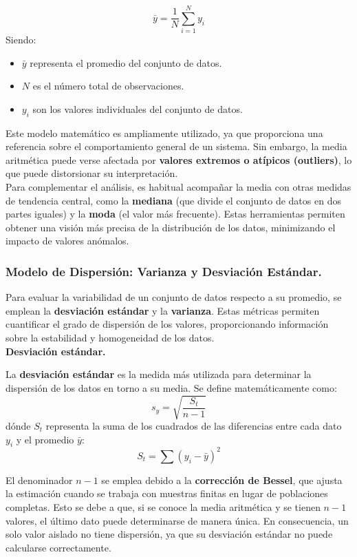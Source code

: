 \documentclass{article}
\begin{document}
\begin{equation}
    \bar{y} = \frac{1}{N} \sum_{i=1}^{N} y_i
\end{equation}
Siendo:
\begin{itemize}
    \item $\bar{y}$ representa el promedio del conjunto de datos.
    \item $N$ es el número total de observaciones.
    \item $y_i$ son los valores individuales del conjunto de datos.
\end{itemize}
Este modelo matemático es ampliamente utilizado, ya que proporciona una referencia sobre el comportamiento general de un sistema. Sin embargo, la media aritmética puede verse afectada por \textbf{valores extremos o atípicos (outliers)}, lo que puede distorsionar su interpretación.\\

Para complementar el análisis, es habitual acompañar la media con otras medidas de tendencia central, como la \textbf{mediana} (que divide el conjunto de datos en dos partes iguales) y la \textbf{moda} (el valor más frecuente). Estas herramientas permiten obtener una visión más precisa de la distribución de los datos, minimizando el impacto de valores anómalos.

\subsubsection{Modelo de Dispersión: Varianza y Desviación Estándar.}
Para evaluar la variabilidad de un conjunto de datos respecto a su promedio, se emplean la \textbf{desviación estándar} y la \textbf{varianza}. Estas métricas permiten cuantificar el grado de dispersión de los valores, proporcionando información sobre la estabilidad y homogeneidad de los datos.\\

\noindent \textbf{Desviación estándar.}

\noindent La \textbf{desviación estándar} es la medida más utilizada para determinar la dispersión de los datos en torno a su media. Se define matemáticamente como:
\begin{equation}
    s_y = \sqrt{\frac{S_t}{n-1}}
\end{equation}
dónde $S_t$ representa la suma de los cuadrados de las diferencias entre cada dato $y_i$ y el promedio $\bar{y}$:
$$
S_t = \sum (y_i - \bar{y})^2
$$

El denominador $n-1$ se emplea debido a la \textbf{corrección de Bessel}, que ajusta la estimación cuando se trabaja con muestras finitas en lugar de poblaciones completas. Esto se debe a que, si se conoce la media aritmética y se tienen $n-1$ valores, el último dato puede determinarse de manera única. En consecuencia, un solo valor aislado no tiene dispersión, ya que su desviación estándar no puede calcularse correctamente.\\
\end{document}
